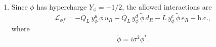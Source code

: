 \begin{solution}
\begin{enumerate}[label=\roman*)]
        Now, expanding the terms quadratic in the gauge fields around the vacuum, we find
        \begin{equation}
            \mathcal L_{\rm mass}
            =
            \frac{v^2+u^2+w^2}{8}
            \left[
                g^2\left((W_\mu^1)^2+(W_\mu^2)^2\right)
                +(gW_\mu^3-g'B_\mu)^2
            \right].
        \end{equation}
        Therefore,
        \begin{equation}
            m_W^2=\frac{g^2}{4}(v^2+u^2+w^2).
        \end{equation}
        Defining
        \begin{equation}
            Z_\mu=\cos\theta_W W_\mu^3-\sin\theta_W B_\mu,
            \qquad
            A_\mu=\sin\theta_W W_\mu^3+\cos\theta_W B_\mu,
        \end{equation}
        where
        \begin{equation}
            \cos\theta_W=\frac{g}{\sqrt{g^2+g'^2}},
        \end{equation}
        we obtain
        \begin{equation}
            m_Z^2=\frac{g^2+g'^2}{4}(v^2+u^2+w^2),
            \qquad
            m_\gamma^2=0.
        \end{equation}
        \item Since $\phi$ has hypercharge
$Y_\phi=-1/2$, the allowed interactions are
\begin{equation}
    \mathcal L_{\phi f}
    =
    -\bar Q_L\, y_\phi^u\,\phi\,u_R
    -\bar Q_L\, y_\phi^d\,\widetilde\phi\,d_R
    -\bar L\, y_\phi^e\,\widetilde\phi\,e_R
    +\text{h.c.},
\end{equation}
where
\begin{equation}
    \widetilde\phi=i\sigma^2\phi^*.
\end{equation}
    \end{enumerate}
\end{solution}


